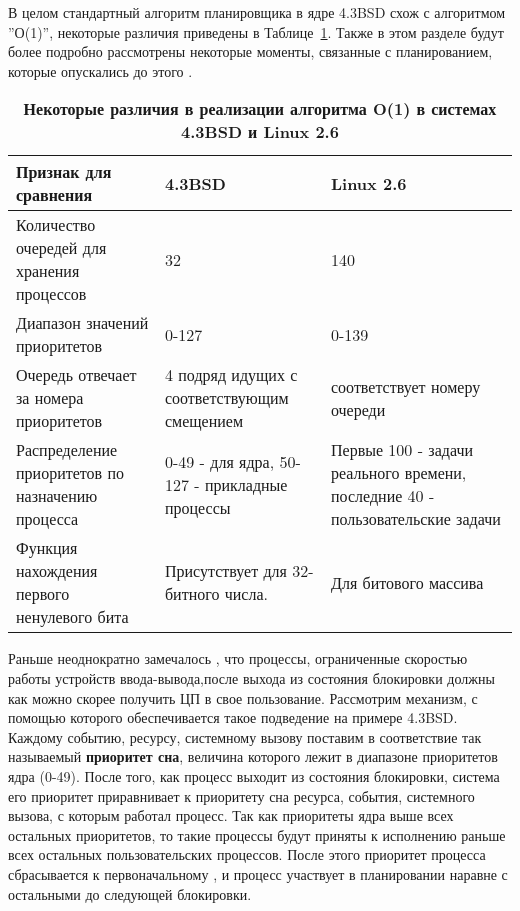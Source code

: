 
В целом стандартный алгоритм планировщика в ядре 4.3BSD схож с алгоритмом ''О(1)'', некоторые различия приведены в Таблице~\ref{Tables:BsdLinuxO(1)diff}. Также в этом разделе будут более подробно рассмотрены некоторые моменты, связанные с планированием, которые опускались до этого \cite{vahalia} .\\

\begin{table}[H]
\begin{tabularx}{\textwidth}{|X|X|X|}
\hline
\textbf{Признак для сравнения} & \textbf{4.3BSD} & \textbf{Linux 2.6}\\
\hline
	Количество очередей для хранения процессов & 32 & 140\\
\hline
	Диапазон значений приоритетов & 0-127& 0-139\\
\hline
	Очередь отвечает  за номера приоритетов & 4 подряд идущих с соответствующим смещением & соответствует 		номеру  очереди\\
\hline
	Распределение приоритетов по назначению процесса&0-49 - для ядра, 50-127 - прикладные процессы & Первые 100 - задачи реального времени, последние 40 - пользовательские задачи\\
\hline
	Функция нахождения первого ненулевого бита& Присутствует для 32-битного числа. & Для битового массива\\
\hline
\end{tabularx}
\caption{\textbf{Некоторые различия в реализации алгоритма O(1) в системах 4.3BSD и Linux 2.6}}
\label{Tables:BsdLinuxO(1)diff}
\end{table}
Раньше неоднократно замечалось , что процессы, ограниченные скоростью работы устройств ввода-вывода,после выхода из состояния блокировки должны как можно скорее получить ЦП в свое пользование. Рассмотрим механизм, с помощью которого обеспечивается такое подведение на примере 4.3BSD.\\Каждому событию, ресурсу, системному вызову поставим в соответствие так называемый \textbf{приоритет сна}, величина которого лежит в диапазоне приоритетов ядра (0-49). После того, как процесс выходит из состояния блокировки, система его приоритет приравнивает к приоритету сна ресурса, события, системного вызова, с которым работал процесс. Так как приоритеты ядра выше всех остальных приоритетов, то такие процессы будут приняты к исполнению раньше всех остальных пользовательских процессов. После этого приоритет процесса сбрасывается к первоначальному , и процесс участвует в планировании наравне с остальными до следующей блокировки.\\
